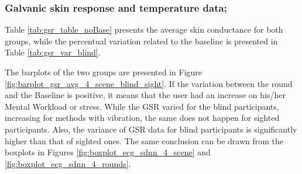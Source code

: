 \subsubsection{Galvanic skin response and temperature data;}
\label{subsubsec:results_gsr_temp_2}

Table \ref{tab:gsr_table_noBase} presents the average skin conductance for both groups, while the percentual variation related to the baseline is presented in Table \ref{tab:gsr_var_blind}.





The barplots of the two groups are presented in Figure \ref{fig:barplot_gsr_avg_4_scene_blind_sight}. If the variation between the round and the Baseline is positive, it means that the user had an increase on his/her Mental Workload or stress. While the GSR varied for the blind participants, increasing for methods with vibration, the same does not happen for sighted participants. Also, the variance of GSR data for blind participants is significantly higher than that of sighted ones. The same conclusion can be drawn from the boxplots in Figures \ref{fig:boxplot_ecg_sdnn_4_scene} and \ref{fig:boxplot_ecg_sdnn_4_rounds}. 

